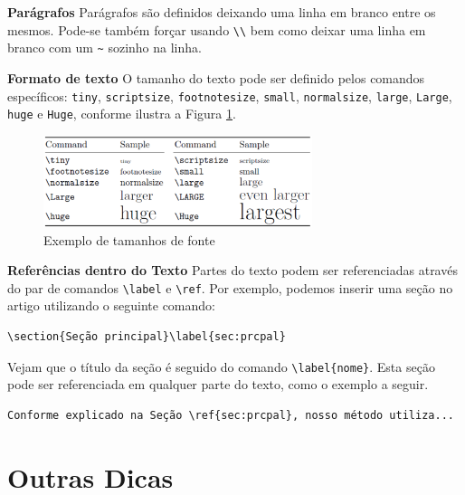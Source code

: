\begin{anexosenv}
\textbf{Parágrafos} Parágrafos são definidos deixando uma linha em branco entre os mesmos.
  Pode-se também forçar usando \verb|\\| bem como deixar uma linha em branco com um \verb|~| sozinho na linha.

\textbf{Formato de texto} O tamanho do texto pode ser definido pelos comandos específicos:  \verb|tiny|,  \verb|scriptsize|,  \verb|footnotesize|, \verb|small|, \verb|normalsize|, \verb|large|, \verb|Large|, \verb|huge| e \verb|Huge|, conforme ilustra a Figura \ref{fig:fontsize}.

\begin{figure}[ht]
	\centering
		\includegraphics[width=0.7\textwidth]{img/fontsize}
	\caption{Exemplo de tamanhos de fonte}
	\label{fig:fontsize}
\end{figure}

\textbf{Referências dentro do Texto} Partes do texto podem ser referenciadas através do par de comandos \verb|\label| e \verb|\ref|.
  Por exemplo, podemos inserir uma seção no artigo utilizando o seguinte comando:

\begin{verbatim}
\section{Seção principal}\label{sec:prcpal}
\end{verbatim}

Vejam que o título da seção é seguido do comando \verb|\label{nome}|.
  Esta seção pode ser referenciada em qualquer parte do texto, como o exemplo a seguir.

\begin{verbatim}
Conforme explicado na Seção \ref{sec:prcpal}, nosso método utiliza...
\end{verbatim}


\section{Outras Dicas}


\end{anexosenv}
